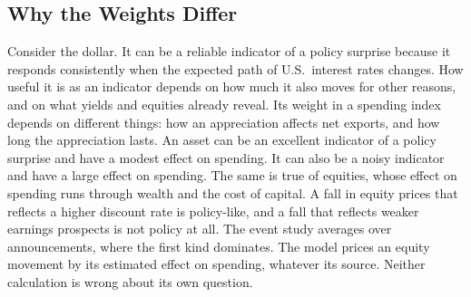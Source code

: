 \documentclass[11pt]{article}
\begin{document}
\subsection{Why the Weights Differ}\label{sec:why}
Consider the dollar. It can be a reliable indicator of a policy surprise because it responds consistently when the expected path of U.S.\ interest rates changes. How useful it is as an indicator depends on how much it also moves for other reasons, and on what yields and equities already reveal. Its weight in a spending index depends on different things: how an appreciation affects net exports, and how long the appreciation lasts. An asset can be an excellent indicator of a policy surprise and have a modest effect on spending. It can also be a noisy indicator and have a large effect on spending. The same is true of equities, whose effect on spending runs through wealth and the cost of capital. A fall in equity prices that reflects a higher discount rate is policy-like, and a fall that reflects weaker earnings prospects is not policy at all. The event study averages over announcements, where the first kind dominates. The model prices an equity movement by its estimated effect on spending, whatever its source. Neither calculation is wrong about its own question.
\end{document}
